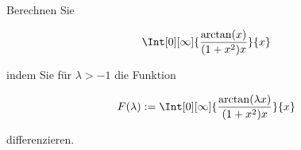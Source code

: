 
\begin{exercise}

Berechnen Sie

\begin{align*}
    \Int[0][\infty]
    {
        \frac
        {
            \arctan(x)
        }{
            (1 + x^2) x
        }
    }{x}
\end{align*}

indem Sie für $\lambda > -1$ die Funktion

\begin{align*}
    F(\lambda)
    :=
    \Int[0][\infty]
    {
        \frac
        {
            \arctan(\lambda x)
        }{
            (1 + x^2) x
        }
    }{x}
\end{align*}

differenzieren.

\end{exercise}


